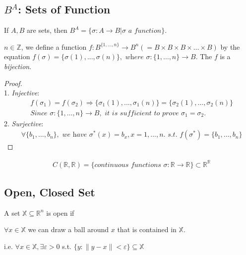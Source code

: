 \documentclass[11pt]{elegantbook}
\begin{document}
\subsection{$B^A$: Sets of Function}
If $A,B$ are sets, then $B^A=\{\sigma:A \rightarrow B| \sigma \textit{ a function}\}$.
\begin{example}
    $n\in \mathbb{Z}$, we define a function $f: B^{\{1,\dots,n\}} \rightarrow B^n(=B\times B\times B\times \dots \times B)$ by the equation
    $f(\sigma)=\{\sigma(1),...,\sigma(n)\}, \textit{ where }\sigma:\{1,\dots,n\} \rightarrow B$. The $f$ is a \textit{bijection}.
\end{example}
\begin{proof}
    \quad\\
    1. \textit{Injective}:
    \begin{equation}
        \begin{aligned}
            &f(\sigma_1)=f(\sigma_2)
            \Rightarrow \{\sigma_1(1),...,\sigma_1(n)\}=\{\sigma_2(1),...,\sigma_2(n)\}\\
            &\textit{Since }\sigma:\{1,\dots,n\} \rightarrow B,\textit{ it is sufficient to prove }\sigma_1=\sigma_2.
        \end{aligned}
        \nonumber
    \end{equation}
    2. \textit{Surjective}:
    \begin{equation}
        \begin{aligned}
            &\forall \{b_1,...,b_n\},\textit{ we have }\sigma^*(x)=b_x,x=1,...,n.\textit{ s.t. }f(\sigma^*)=\{b_1,...,b_n\}
        \end{aligned}
        \nonumber
    \end{equation}

\end{proof}
\begin{example}
    \begin{equation}
        \begin{aligned}
            & C(\mathbb{R},\mathbb{R})=\{\textit{continuous functions }\sigma:\mathbb{R} \rightarrow \mathbb{R} \}\subset \mathbb{R}^\mathbb{R}
        \end{aligned}
        \nonumber
    \end{equation}
\end{example}

\subsection{Open, Closed Set}
\begin{definition}
    A set $\mathbb{X} \subseteq \mathbb{R}^{n}$ is open if
    
    $\forall x \in \mathbb{X}$ we can draw a ball around $x$ that is contained in $\mathbb{X}$.

    i.e. $\forall x \in \mathbb{X}, \exists \varepsilon>0$ s.t. $\{y:\|y-x\|<\varepsilon\} \subseteq \mathbb{X}$
\end{definition}
\end{document}
